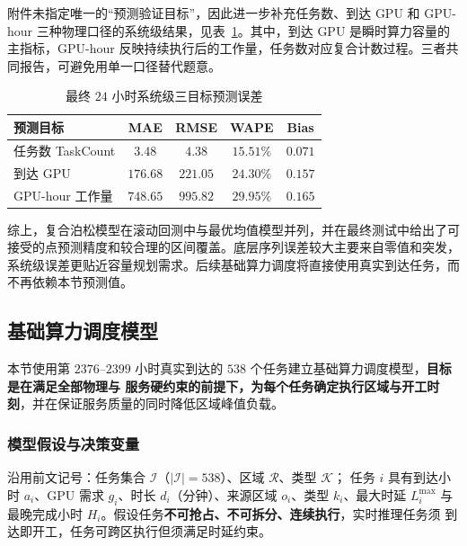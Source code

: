 \documentclass[UTF8,a4paper,zihao=-4]{ctexart}
\begin{document}
附件未指定唯一的“预测验证目标”，因此进一步补充任务数、到达 GPU 和 GPU-hour 三种物理口径的系统级结果，见表~\ref{tab:forecast-three-targets}。其中，到达 GPU 是瞬时算力容量的主指标，GPU-hour 反映持续执行后的工作量，任务数对应复合计数过程。三者共同报告，可避免用单一口径替代题意。

\begin{table}[htbp]
\centering
\small
\caption{最终 $24$ 小时系统级三目标预测误差}
\label{tab:forecast-three-targets}
\begin{tabular}{lcccc}
\toprule
预测目标 & MAE & RMSE & WAPE & Bias \\
\midrule
任务数 TaskCount     & $3.48$   & $4.38$   & $15.51\%$ & $0.071$ \\
到达 GPU             & $176.68$ & $221.05$ & $24.30\%$ & $0.157$ \\
GPU-hour 工作量      & $748.65$ & $995.82$ & $29.95\%$ & $0.165$ \\
\bottomrule
\end{tabular}
\end{table}

综上，复合泊松模型在滚动回测中与最优均值模型并列，并在最终测试中给出了可接受的点预测精度和较合理的区间覆盖。底层序列误差较大主要来自零值和突发，系统级误差更贴近容量规划需求。后续基础算力调度将直接使用真实到达任务，而不再依赖本节预测值。

\subsection{基础算力调度模型}
\label{sec:q1-schedule}

本节使用第 $2376$--$2399$ 小时真实到达的 $538$ 个任务建立基础算力调度模型，\textbf{目标是在满足全部物理与
服务硬约束的前提下，为每个任务确定执行区域与开工时刻}，并在保证服务质量的同时降低区域峰值负载。

\subsubsection{模型假设与决策变量}
沿用前文记号：任务集合 $\mathcal{I}$（$|\mathcal{I}|=538$）、区域 $\mathcal{R}$、类型 $\mathcal{K}$；
任务 $i$ 具有到达小时 $a_i$、GPU 需求 $g_i$、时长 $d_i$（分钟）、来源区域 $o_i$、类型 $k_i$、最大时延
$L_i^{\max}$ 与最晚完成小时 $H_i$。假设任务\textbf{不可抢占、不可拆分、连续执行}，实时推理任务须
到达即开工，任务可跨区执行但须满足时延约束。
\end{document}
